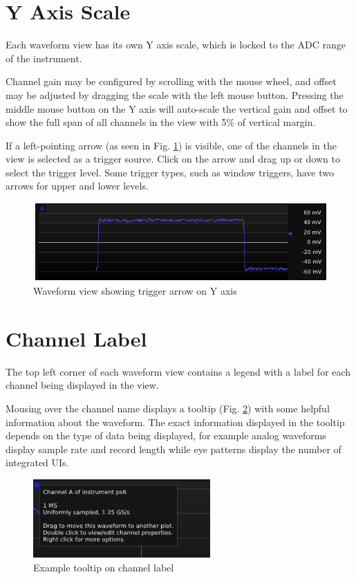 \section{Y Axis Scale}

Each waveform view has its own Y axis scale, which is locked to the ADC range of the instrument.

Channel gain may be configured by scrolling with the mouse wheel, and offset may be adjusted by dragging the scale with
the left mouse button. Pressing the middle mouse button on the Y axis will auto-scale the vertical gain and offset to
show the full span of all channels in the view with 5\% of vertical margin.

If a left-pointing arrow (as seen in Fig. \ref{y-axis}) is visible, one of the channels in the view is selected as a
trigger source. Click on the arrow and drag up or down to select the trigger level. Some trigger types, such as window
triggers, have two arrows for upper and lower levels.

\begin{figure}[H]
\centering
\includegraphics[height=3cm]{ng-images/y-axis.png}
\caption{Waveform view showing trigger arrow on Y axis}
\label{y-axis}
\end{figure}

\section{Channel Label}

The top left corner of each waveform view contains a legend with a label for each channel being displayed in the view.

Mousing over the channel name displays a tooltip (Fig. \ref{channel-tooltip}) with some helpful information about the
waveform. The exact information displayed in the tooltip depends on the type of data being displayed, for example
analog waveforms display sample rate and record length while eye patterns display the number of integrated UIs.

\begin{figure}[H]
\centering
\includegraphics[height=3cm]{ng-images/channel-tooltip.png}
\caption{Example tooltip on channel label}
\label{channel-tooltip}
\end{figure}

